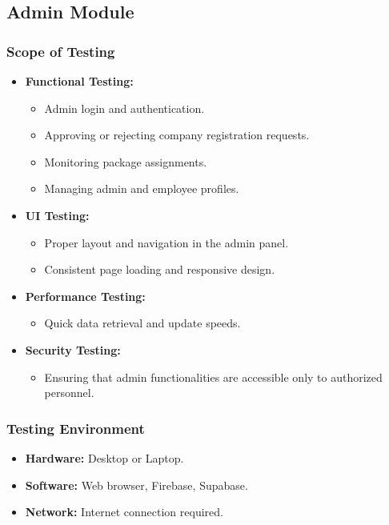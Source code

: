 \documentclass{article}
\begin{document}
\subsection{Admin Module}

\subsubsection{Scope of Testing}
\begin{itemize}
    \item \textbf{Functional Testing:}
    \begin{itemize}
        \item Admin login and authentication.
        \item Approving or rejecting company registration requests.
        \item Monitoring package assignments.
        \item Managing admin and employee profiles.
    \end{itemize}
    \item \textbf{UI Testing:}
    \begin{itemize}
        \item Proper layout and navigation in the admin panel.
        \item Consistent page loading and responsive design.
    \end{itemize}
    \item \textbf{Performance Testing:}
    \begin{itemize}
        \item Quick data retrieval and update speeds.
    \end{itemize}
    \item \textbf{Security Testing:}
    \begin{itemize}
        \item Ensuring that admin functionalities are accessible only to authorized personnel.
    \end{itemize}
\end{itemize}

\subsubsection{Testing Environment}
\begin{itemize}
    \item \textbf{Hardware:} Desktop or Laptop.
    \item \textbf{Software:} Web browser, Firebase, Supabase.
    \item \textbf{Network:} Internet connection required.
\end{itemize}
\end{document}
